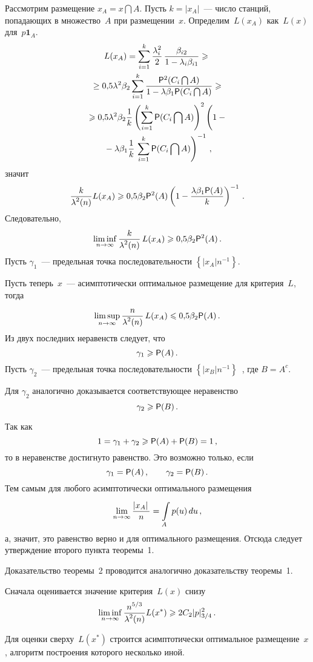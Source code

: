 \begin{multicols}{2}
Рассмотрим размещение $x_A=x\bigcap A$. Пусть $k=\left|x_A\right|$~--- число станций,
попадающих в множество~$A$ при размещении~$x$. Определим~$L(x_A)$ как~$L(x)$ для~$p\mathbf{1}_A$.
\begin{multline*}
L(x_A)=\suml{i=1}{k}\fr{\lambda_i^2}{2}\,\fr{\beta_{i2}} {1-\lambda_i \beta_{i1}}\geqslant{}\\
{}\geq
0{,}5\lambda^2\beta_2\suml{i=1}{k} \frac{{\p}^2(C_i\bigcap A)} {1-\lambda \beta_1
{\p}(C_i\bigcap A)}\geqslant{}\\
{}\geqslant 0{,}5\lambda^2\beta_2 \fr{1}{k}\left(\suml{i=1}{k}{\p}(C_i\bigcap A)\right)^2
\left(
\vphantom{\suml{i=1}{k}}
1-{}\right.\\
\left.{}-\lambda \beta_1 \fr{1}{k}\,\suml{i=1}{k}{\p}(C_i\bigcap A)\right)^{-1}\,,
\end{multline*}
значит
$$
\displaystyle\frac{\displaystyle k\mathstrut}{\displaystyle \lambda^2(n)\mathstrut}L(x_A)\geqslant 0{,}5\beta_2{{\sf P}}^2(A)\left(1-\displaystyle\frac{\displaystyle \lambda \beta_1
{{\sf P}}(A)\mathstrut}{\displaystyle k\mathstrut}\right)^{-1}\,.
$$
Следовательно,
$$
\liminf\limits_{n \to \infty}\displaystyle\frac{\displaystyle k\mathstrut}{\displaystyle \lambda^2(n)\mathstrut}\,L(x_A)\geqslant 0{,}5\beta_2{{\sf P}}^2(A)\,.
$$
Пусть $\gamma_1$~--- предельная точка последовательности $\left\{\left|x_A\right|n^{-1}
\right\}$.
\smallskip

Пусть теперь~$x$~--- асимптотически оптимальное размещение для критерия~$L$, тогда
$$
\limsup\limits_{n \to \infty}\displaystyle\frac{\displaystyle n\mathstrut}{\displaystyle \lambda^2(n)\mathstrut}\,L(x_A) \leqslant 0{,}5\beta_2{{\sf P}}(A)\,.
$$
Из двух последних неравенств следует, что
$$
\gamma_1 \geqslant{{\sf P}}(A)\,.
$$
Пусть $\gamma_2$~--- предельная точка последовательности $\left\{\left|x_B\right|n^{-1}
\right\}$~, где $B=A^c$.

Для $\gamma_2$ аналогично доказывается соответству\-ющее неравенство
$$
\gamma_2 \geqslant {{\sf P}}(B)\,.
$$

Так как
$$
1=\gamma_1+\gamma_2\geqslant {{\sf P}}(A)+{{\sf P}}(B)=1\,,
$$
то в неравенстве достигнуто равенство. Это возможно только, если
$$
\gamma_1={{\sf P}}(A)\,, \qquad \gamma_2={{\sf P}}(B)\,.
$$
Тем самым для любого асимптотически оптимального размещения
$$
\lim\limits_{n\rightarrow\infty}\displaystyle\frac{\displaystyle \left|x_A\right|\mathstrut}{\displaystyle n\mathstrut}=\int\limits_{A}^{}p(u)\,du\,,
$$
а, значит, это равенство верно и для оптимального размещения. Отсюда следует утверждение
второго пункта теоремы~1.

Доказательство теоремы~2 проводится аналогично доказательству теоремы~1.

Сначала оценивается значение критерия~$L(x)$ снизу
$$
\liminf\limits_{n \to \infty} \displaystyle\frac{\displaystyle n^{5/3}\mathstrut}{\displaystyle \lambda^2(n)\mathstrut}L(x^*)\geqslant 2C_2|p|_{3/4}^2\,.
$$

Для оценки сверху~$L(x^*)$ строится асимптотически оптимальное размещение~$x$, алгоритм
по\-стро\-ения которого несколько иной.


\end{multicols}
